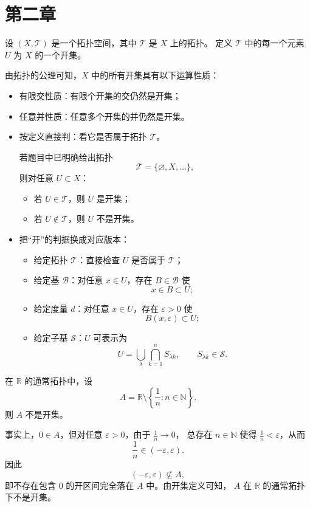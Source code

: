 \chapter{第二章}
\begin{definition}[拓扑空间中的开集]
设 $(X,\mathcal{T})$ 是一个拓扑空间，其中 $\mathcal{T}$ 是 $X$ 上的拓扑。
定义 $\mathcal{T}$ 中的每一个元素 $U$ 为 $X$ 的一个开集。

由拓扑的公理可知，$X$ 中的所有开集具有以下运算性质：
\begin{itemize}
  \item 有限交性质：有限个开集的交仍然是开集；
  \item 任意并性质：任意多个开集的并仍然是开集。
\end{itemize}
\end{definition}
\begin{itemize}
  \item[(1)] 按定义直接判：看它是否属于拓扑 $\mathcal T$。

  若题目中已明确给出拓扑
  \[
  \mathcal T=\{\varnothing,X,\dots\},
  \]
  则对任意 $U\subset X$：
  \begin{itemize}
    \item 若 $U\in\mathcal T$，则 $U$ 是开集；
    \item 若 $U\notin\mathcal T$，则 $U$ 不是开集。
  \end{itemize}

  \item[(2)] 把“开”的判据换成对应版本：
  \begin{itemize}
    \item 给定拓扑 $\mathcal T$：直接检查 $U$ 是否属于 $\mathcal T$；
    \item 给定基 $\mathcal B$：对任意 $x\in U$，存在 $B\in\mathcal B$ 使
    \[
    x\in B\subset U;
    \]
    \item 给定度量 $d$：对任意 $x\in U$，存在 $\varepsilon>0$ 使
    \[
    B(x,\varepsilon)\subset U;
    \]
    \item 给定子基 $\mathcal S$：$U$ 可表示为
    \[
    U=\bigcup_{\lambda}\bigcap_{k=1}^n S_{\lambda k},
    \qquad S_{\lambda k}\in\mathcal S.
    \]
  \end{itemize}
\end{itemize}
\begin{example}[他的补集也不是闭集]
    在 $\mathbb R$ 的通常拓扑中，设
\[
A=\mathbb R\setminus\left\{\frac1n:n\in\mathbb N\right\}.
\]
则 $A$ 不是开集。

事实上，$0\in A$，但对任意 $\varepsilon>0$，由于 $\frac{1}{n}\to 0$，
总存在 $n\in\mathbb N$ 使得 $\frac{1}{n}<\varepsilon$，从而
\[
\frac{1}{n}\in(-\varepsilon,\varepsilon).
\]
因此
\[
(-\varepsilon,\varepsilon)\nsubseteq A,
\]
即不存在包含 $0$ 的开区间完全落在 $A$ 中。由开集定义可知，
$A$ 在 $\mathbb R$ 的通常拓扑下不是开集。
\end{example}
